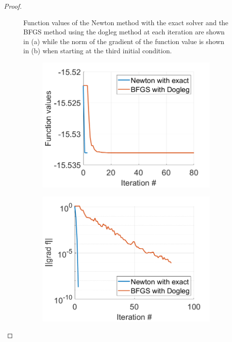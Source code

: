 \documentclass[12pt]{report}
\begin{document}
\begin{problem}
\begin{proof}
\begin{figure}[H]
\begin{subfigure}[b]{0.5\linewidth}
        \caption{}
        \label{fig6:b}
        \vspace{4ex}
    \end{subfigure}
    \caption{Function values of the Newton method with the exact solver and the BFGS method using the dogleg method at each iteration are shown in (a) while the norm of the gradient of the function value is shown in (b) when starting at the third initial condition.}
    \label{fig6}
\end{figure}
\begin{figure}[H]
    \begin{subfigure}[b]{0.5\linewidth}
        \centering
        \includegraphics[width=\linewidth]{images/3-4-fun.png}
        \caption{}
        \label{fig7:a}
        \vspace{4ex}
    \end{subfigure}%
    \begin{subfigure}[b]{0.5\linewidth}
        \centering
        \includegraphics[width=\linewidth]{images/3-4-grad.png}

\end{subfigure}
\end{figure}
\end{proof}
\end{problem}
\end{document}
